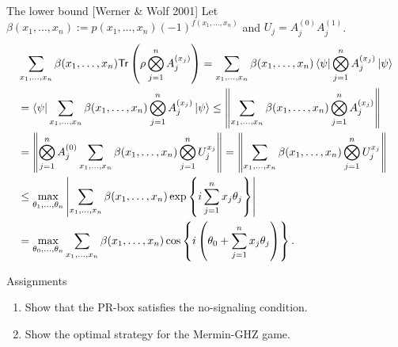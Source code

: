 \documentclass{beamer}
\newcommand{\Tr}{\mathsf{Tr}}
\begin{document}
\begin{frame}{The lower bound {\small [Werner \& Wolf 2001]}}
\small
Let $\beta(x_1,\dotsc,x_n):=p(x_1,\dotsc,x_n)(-1)^{f(x_1,\dotsc,x_n)}$ and $U_j = A_j^{(0)}A_j^{(1)}$.
\begin{align*}
&\sum_{x_1,\dotsc,x_n}\beta(x_1,\dotsc,x_n)\Tr\left(\rho\bigotimes_{j=1}^n A_j^{(x_j)}\right)
=\sum_{x_1,\dotsc,x_n}\beta(x_1,\dotsc,x_n)\bra{\psi}\bigotimes_{j=1}^n A_j^{(x_j)}\ket{\psi}\\
&=\bra{\psi}\sum_{x_1,\dotsc,x_n}\beta(x_1,\dotsc,x_n)\bigotimes_{j=1}^n A_j^{(x_j)}\ket{\psi}
\le\left\|\sum_{x_1,\dotsc,x_n}\beta(x_1,\dotsc,x_n)\bigotimes_{j=1}^n A_j^{(x_j)}\right\|\\
&=\left\|\bigotimes_{j=1}^nA_j^{(0)}\sum_{x_1,\dotsc,x_n}\beta(x_1,\dotsc,x_n)\bigotimes_{j=1}^n U_j^{x_j}\right\|
=\left\|\sum_{x_1,\dotsc,x_n}\beta(x_1,\dotsc,x_n)\bigotimes_{j=1}^n U_j^{x_j}\right\|\\
&\le\max_{\theta_1,\dotsc,\theta_n}\left|\sum_{x_1,\dotsc,x_n}\beta(x_1,\dotsc,x_n)\exp\left\{i\sum_{j=1}^n x_j\theta_j\right\}\right|\\
&=\max_{\theta_0,\dotsc,\theta_n}\sum_{x_1,\dotsc,x_n}\beta(x_1,\dotsc,x_n)\cos\left\{i\left(\theta_0 + \sum_{j=1}^n x_j\theta_j\right)\right\}.
\end{align*}
\end{frame}

\begin{frame}{Assignments}
\begin{enumerate}
\setlength{\itemsep}{2em}
\item Show that the PR-box satisfies the no-signaling condition.
\item Show the optimal strategy for the Mermin-GHZ game.
\end{enumerate}
\end{frame}
\end{document}
